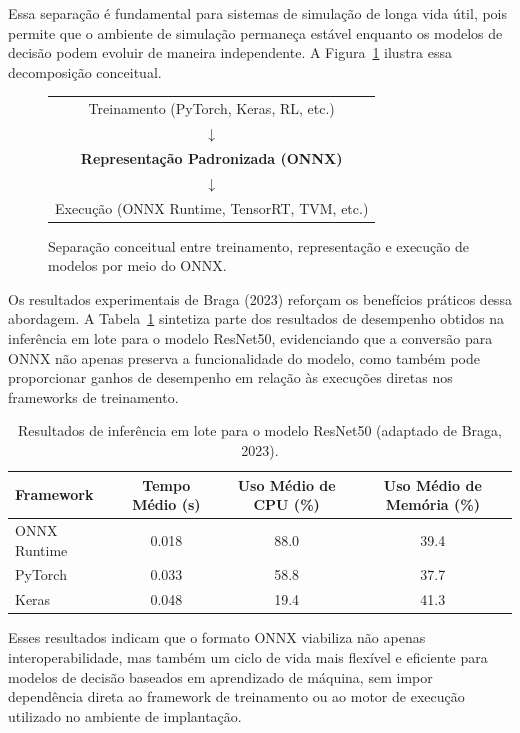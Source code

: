 Essa separação é fundamental para sistemas de simulação de longa vida útil, pois permite que o ambiente de simulação permaneça estável enquanto os modelos de decisão podem evoluir de maneira independente. A Figura~\ref{fig:separacao_onnx} ilustra essa decomposição conceitual.

\begin{figure}[h]
\centering
\begin{tabular}{c}
Treinamento (PyTorch, Keras, RL, etc.) \\
$\downarrow$ \\
\textbf{Representação Padronizada (ONNX)} \\
$\downarrow$ \\
Execução (ONNX Runtime, TensorRT, TVM, etc.)
\end{tabular}
\caption{Separação conceitual entre treinamento, representação e execução de modelos por meio do ONNX.}
\label{fig:separacao_onnx}
\end{figure}

Os resultados experimentais de Braga (2023) reforçam os benefícios práticos dessa abordagem. A Tabela~\ref{tab:desempenho_onnx} sintetiza parte dos resultados de desempenho obtidos na inferência em lote para o modelo ResNet50, evidenciando que a conversão para ONNX não apenas preserva a funcionalidade do modelo, como também pode proporcionar ganhos de desempenho em relação às execuções diretas nos frameworks de treinamento.

\begin{table}[h]
\centering
\begin{tabular}{lccc}
\hline
\textbf{Framework} & \textbf{Tempo Médio (s)} & \textbf{Uso Médio de CPU (\%)} & \textbf{Uso Médio de Memória (\%)} \\
\hline
ONNX Runtime & 0.018 & 88.0 & 39.4 \\
PyTorch & 0.033 & 58.8 & 37.7 \\
Keras & 0.048 & 19.4 & 41.3 \\
\hline
\end{tabular}
\caption{Resultados de inferência em lote para o modelo ResNet50 (adaptado de Braga, 2023).}
\label{tab:desempenho_onnx}
\end{table}

Esses resultados indicam que o formato ONNX viabiliza não apenas interoperabilidade, mas também um ciclo de vida mais flexível e eficiente para modelos de decisão baseados em aprendizado de máquina, sem impor dependência direta ao framework de treinamento ou ao motor de execução utilizado no ambiente de implantação.

